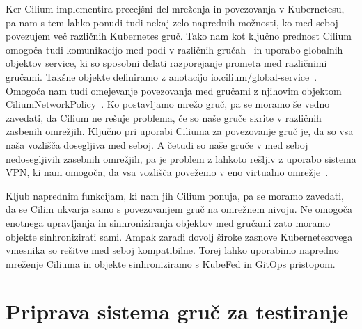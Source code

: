 \documentclass[a4paper, 12pt]{book}
\begin{document}
Ker Cilium implementira precejšni del mreženja in povezovanja v Kubernetesu, pa nam s tem lahko ponudi tudi nekaj zelo naprednih možnosti, ko med seboj povezujem več različnih Kubernetes gruč.
Tako nam kot ključno prednost Cilium omogoča tudi komunikacijo med podi v različnih gručah~\cite{cilium-cluster-mesh} in uporabo globalnih objektov service, ki so sposobni delati razporejanje prometa med različnimi gručami.
Takšne objekte definiramo z anotacijo io.cilium/global-service~\cite{setup-cilium-cluster-mesh}.
Omogoča nam tudi omejevanje povezovanja med gručami z njihovim objektom CiliumNetworkPolicy~\cite{setup-cilium-cluster-mesh}.
Ko postavljamo mrežo gruč, pa se moramo še vedno zavedati, da Cilium ne rešuje problema, če so naše gruče skrite v različnih zasbenih omrežjih.
Ključno pri uporabi Ciliuma za povezovanje gruč je, da so vsa naša vozlišča dosegljiva med seboj.
A četudi so naše gruče v med seboj nedosegljivih zasebnih omrežjih, pa je problem z lahkoto rešljiv z uporabo sistema VPN, ki nam omogoča, da vsa vozlišča povežemo v eno virtualno omrežje~\cite{setup-cilium-cluster-mesh}.

Kljub naprednim funkcijam, ki nam jih Cilium ponuja, pa se moramo zavedati, da se Cilim ukvarja samo s povezovanjem gruč na omrežnem nivoju.
Ne omogoča enotnega upravljanja in sinhroniziranja objektov med gručami zato moramo objekte sinhronizirati sami.
Ampak zaradi dovolj široke zasnove Kubernetesovega vmesnika so rešitve med seboj kompatibilne.
Torej lahko uporabimo napredno mreženje Ciliuma in objekte sinhroniziramo s KubeFed in GitOps pristopom.
\chapter{Priprava sistema gruč za testiranje}
\end{document}
